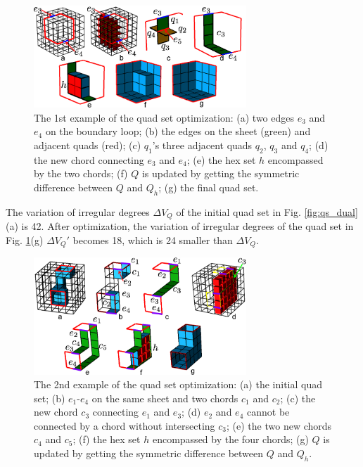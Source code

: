 \documentclass[final,5p,times,twocolumn]{elsarticle}
\begin{document}
\begin{figure}[htbp]
\begin{center}
\includegraphics[width=8cm]{qs_opt1.png}
\caption{The 1st example of the quad set optimization: (a) two edges $e_3$ and $e_4$ on the boundary loop; (b) the edges on the sheet (green) and adjacent quads (red); (c) $q_1$'s three adjacent quads $q_2$, $q_3$ and $q_4$; (d) the new chord connecting $e_3$ and $e_4$; (e) the hex set $h$ encompassed by the two chords; (f) $Q$ is updated by getting the symmetric difference between $Q$ and $Q_h$; (g) the final quad set.}
\label{fig:qs_opt1}
\end{center}
\end{figure}

The variation of irregular degrees $\Delta V_Q$ of the initial quad set in Fig. \ref{fig:qs_dual}(a) is 42. After optimization, the variation of irregular degrees of the quad set in Fig. \ref{fig:qs_opt1}(g) $\Delta V_Q'$ becomes 18, which is 24 smaller than $\Delta V_Q$.

\begin{figure}[htbp]
\begin{center}
\includegraphics[width=8cm]{qs_opt2.png}
\caption{The 2nd example of the quad set optimization: (a) the initial quad set; (b) $e_1$-$e_4$ on the same sheet and two chords $c_1$ and $c_2$; (c) the new chord $c_3$ connecting $e_1$ and $e_3$; (d) $e_2$ and $e_4$ cannot be connected by a chord without intersecting $c_3$; (e) the two new chords $c_4$ and $c_5$; (f) the hex set $h$ encompassed by the four chords; (g) $Q$ is updated by getting the symmetric difference between $Q$ and $Q_h$.}
\label{fig:qs_opt2}
\end{center}
\end{figure}
\end{document}
